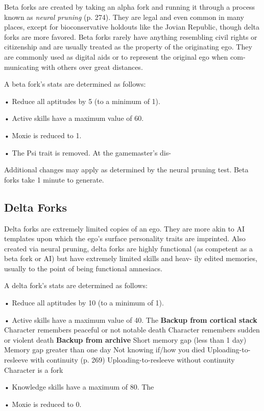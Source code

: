 Beta forks are created by taking an alpha fork and 
running it through a process known as \textit{neural pruning} 
(p. 274). They are legal and even common in many 
places, except for bioconservative holdouts like the 
Jovian Republic, though delta forks are more favored. 
Beta forks rarely have anything resembling civil rights 
or citizenship and are usually treated as the property 
of the originating ego. They are commonly used as 
digital aids or to represent the original ego when com-
municating with others over great distances.

A beta fork's stats are determined as follows:

•  Reduce all aptitudes by 5 (to a minimum of 1). 

•  Active skills have a maximum value of 60.

•  Moxie is reduced to 1.

•  The Psi trait is removed. At the gamemaster's dis-

Additional changes may apply as determined by 
the neural pruning test. Beta forks take 1 minute 
to generate.

\subsection{Delta Forks}

Delta forks are extremely limited copies of an ego. 
They are more akin to AI templates upon which 
the ego's surface personality traits are imprinted. 
Also created via neural pruning, delta forks are 
highly functional (as competent as a beta fork or 
AI) but have extremely limited skills and heav-
ily edited memories, usually to the point of being 
functional amnesiacs.

A delta fork's stats are determined as follows:

•  Reduce all aptitudes by 10 (to a minimum of 1). 

•  Active skills have a maximum value of 40. The 
\textbf{Backup from cortical stack}
Character remembers peaceful or not notable death
Character remembers sudden or violent death
\textbf{Backup from archive}
Short memory gap (less than 1 day)
Memory gap greater than one day
Not knowing if/how you died
Uploading-to-resleeve with continuity (p. 269)
Uploading-to-resleeve without continuity
Character is a fork

•  Knowledge skills have a maximum of 80. The 

•  Moxie is reduced to 0.

